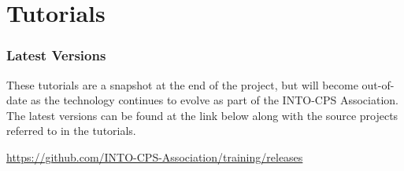 \documentclass[narrowmargin,final,12pt,a4paper]{include/intocpslargereport}   %
\begin{document}
\part{Tutorials}
\label{part:tutorials}

\section*{Latest Versions}

These tutorials are a snapshot at the end of the project, but will become out-of-date as the technology continues to evolve as part of the INTO-CPS Association. The latest versions can be found at the link below along with the source projects referred to in the tutorials.

\url{https://github.com/INTO-CPS-Association/training/releases}

\newpage
\label{tut:1}


\label{tut:1}


\label{tut:1}


{}


{}


{}

\end{document}
